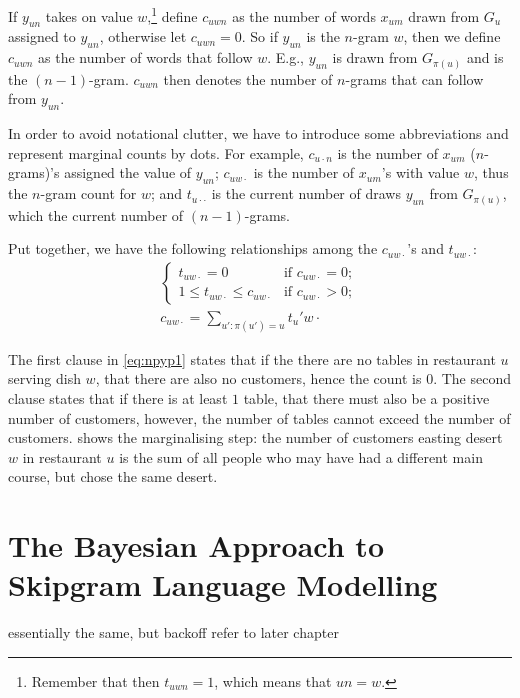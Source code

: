 If $y_{un}$ takes on value $w$,\footnote{Remember that then $t_{uwn}=1$, which means that $un=w$.} define $c_{uwn}$ as the number of words $x_{um}$ drawn from $G_u$ assigned to $y_{un}$, otherwise let $c_{uwn} = 0$. So if $y_{un}$ is the $n$-gram $w$, then we define $c_{uwn}$ as the number of words that follow $w$. E.g., $y_{un}$ is drawn from $G_{\pi(u)}$ and is the $(n-1)$-gram. $c_{uwn}$ then denotes the number of $n$-grams that can follow from $y_{un}$.

In order to avoid notational clutter, we have to introduce some abbreviations and represent marginal counts by dots. For example, $c_{u\cdot n}$ is the number of $x_{um}$ ($n$-grams)'s assigned the value of $y_{un}$; $c_{uw\cdot}$ is the number of $x_{um}$'s with value $w$, thus the $n$-gram count for $w$; and $t_{u\cdot\cdot}$ is the current number of draws $y_{un}$ from $G_{\pi(u)}$, which the current number of $(n-1)$-grams.

Put together, we have the following relationships among the $c_{uw\cdot}$'s and $t_{uw\cdot}$:
\begin{align}
	\begin{cases}
    	t_{uw\cdot} = 0 & \text{if }c_{uw\cdot}=0;\\
        1\leq t_{uw\cdot}\leq c_{uw\cdot} & \text{if }c_{uw\cdot} > 0;
    \end{cases} \label{eq:npyp1}\\
    c_{uw\cdot} = \sum_{u':\pi(u')=u} t_u'w\cdot\label{eq:npyp2}
\end{align}

The first clause in \cref{eq:npyp1} states that if the there are no tables in restaurant $u$ serving dish $w$, that there are also no customers, hence the count is $0$. The second clause states that if there is at least $1$ table, that there must also be a positive number of customers, however, the number of tables cannot exceed the number of customers.
 shows the marginalising step: the number of customers easting desert $w$ in restaurant $u$ is the sum of all people who may have had a different main course, but chose the same desert.

\section{The Bayesian Approach to Skipgram Language Modelling}
essentially the same, but backoff refer to later chapter


